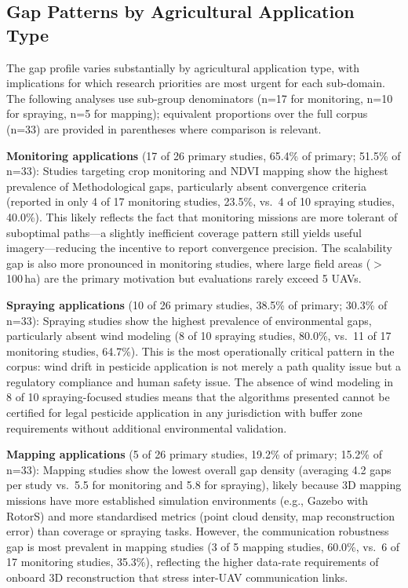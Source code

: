 \documentclass[review,3p,times]{elsarticle}
\begin{document}
\subsection{Gap Patterns by Agricultural Application Type}

The gap profile varies substantially by agricultural application type, with implications for which research priorities are most urgent for each sub-domain. The following analyses use sub-group denominators (n=17 for monitoring, n=10 for spraying, n=5 for mapping); equivalent proportions over the full corpus (n=33) are provided in parentheses where comparison is relevant.

\textbf{Monitoring applications} (17 of 26 primary studies, 65.4\% of primary; 51.5\% of n=33): Studies targeting crop monitoring and NDVI mapping show the highest prevalence of Methodological gaps, particularly absent convergence criteria (reported in only 4 of 17 monitoring studies, 23.5\%, vs.\ 4 of 10 spraying studies, 40.0\%). This likely reflects the fact that monitoring missions are more tolerant of suboptimal paths---a slightly inefficient coverage pattern still yields useful imagery---reducing the incentive to report convergence precision. The scalability gap is also more pronounced in monitoring studies, where large field areas ($>$100\,ha) are the primary motivation but evaluations rarely exceed 5 UAVs.

\textbf{Spraying applications} (10 of 26 primary studies, 38.5\% of primary; 30.3\% of n=33): Spraying studies show the highest prevalence of environmental gaps, particularly absent wind modeling (8 of 10 spraying studies, 80.0\%, vs.\ 11 of 17 monitoring studies, 64.7\%). This is the most operationally critical pattern in the corpus: wind drift in pesticide application is not merely a path quality issue but a regulatory compliance and human safety issue. The absence of wind modeling in 8 of 10 spraying-focused studies means that the algorithms presented cannot be certified for legal pesticide application in any jurisdiction with buffer zone requirements without additional environmental validation.

\textbf{Mapping applications} (5 of 26 primary studies, 19.2\% of primary; 15.2\% of n=33): Mapping studies show the lowest overall gap density (averaging 4.2 gaps per study vs.\ 5.5 for monitoring and 5.8 for spraying), likely because 3D mapping missions have more established simulation environments (e.g., Gazebo with RotorS) and more standardised metrics (point cloud density, map reconstruction error) than coverage or spraying tasks. However, the communication robustness gap is most prevalent in mapping studies (3 of 5 mapping studies, 60.0\%, vs.\ 6 of 17 monitoring studies, 35.3\%), reflecting the higher data-rate requirements of onboard 3D reconstruction that stress inter-UAV communication links.
\end{document}
